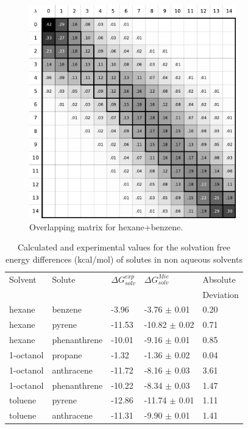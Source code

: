 \FloatBarrier
\begin{figure}[h]
    \centering
    \includegraphics[width=0.8\textwidth]{Figures/ohex_benz}
    \caption{Overlapping matrix for hexane+benzene.}
    \label{fig:hexove}
\end{figure}

\begin{table}[h]
\centering
  \caption{Calculated and experimental values for the solvation free energy differences (kcal/mol) of solutes in non aqueous solvents}
  \label{tbl:solv1}
  \begin{tabular}{lllll}
    \hline
    \hline
      Solvent & Solute & $\Delta G_{solv}^{exp}$&  $\Delta G_{solv}^{Mie}$ & Absolute \\
      & & & & Deviation \\
    \hline
    hexane    & benzene      & -3.96  & -3.76  $\pm$ 0.01 & 0.20 \\
    hexane    & pyrene       & -11.53& -10.82 $\pm$ 0.02 & 0.71 \\
    hexane    & phenanthrene & -10.01& -9.16  $\pm$ 0.01 & 0.85 \\
    1-octanol & propane      & -1.32  & -1.36  $\pm$ 0.02 & 0.04 \\
    1-octanol & anthracene   & -11.72&  -8.16  $\pm$ 0.03 & 3.61 \\
    1-octanol & phenanthrene & -10.22&  -8.34  $\pm$ 0.03 & 1.47 \\
    toluene   & pyrene       & -12.86&  -11.74 $\pm$ 0.01 & 1.11\\
    toluene   & anthracene   & -11.31&  -9.90 $\pm$ 0.01 & 1.41\\
    \hline
    \hline
  \end{tabular}
\end{table}
\FloatBarrier

